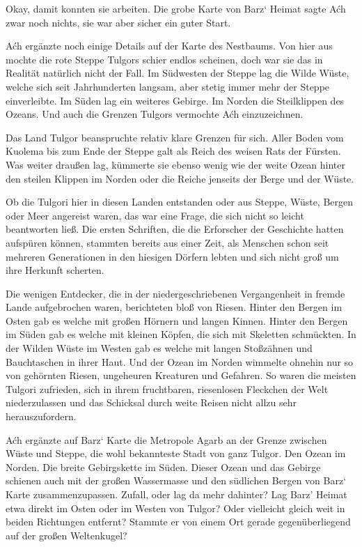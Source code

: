 Okay, damit konnten sie arbeiten. Die grobe Karte von Barz‘ Heimat sagte Aćh zwar noch nichts, sie war aber sicher ein guter Start.

Aćh ergänzte noch einige Details auf der Karte des Nestbaums. Von hier aus mochte die rote Steppe Tulgors schier endlos scheinen, doch war sie das in Realität natürlich nicht der Fall. Im Südwesten der Steppe lag die Wilde Wüste, welche sich seit Jahrhunderten langsam, aber stetig immer mehr der Steppe einverleibte. Im Süden lag ein weiteres Gebirge. Im Norden die Steilklippen des Ozeans. Und auch die Grenzen Tulgors vermochte Aćh einzuzeichnen.

Das Land Tulgor beanspruchte relativ klare Grenzen für sich. Aller Boden vom Kuolema bis zum Ende der Steppe galt als Reich des weisen Rats der Fürsten. Was weiter draußen lag, kümmerte sie ebenso wenig wie der weite Ozean hinter den steilen Klippen im Norden oder die Reiche jenseits der Berge und der Wüste.

Ob die Tulgori hier in diesen Landen entstanden oder aus Steppe, Wüste, Bergen oder Meer angereist waren, das war eine Frage, die sich nicht so leicht beantworten ließ. Die ersten Schriften, die die Erforscher der Geschichte hatten aufspüren können, stammten bereits aus einer Zeit, als Menschen schon seit mehreren Generationen in den hiesigen Dörfern lebten und sich nicht groß um ihre Herkunft scherten.

Die wenigen Entdecker, die in der niedergeschriebenen Vergangenheit in fremde Lande aufgebrochen waren, berichteten bloß von Riesen. Hinter den Bergen im Osten gab es welche mit großen Hörnern und langen Kinnen. Hinter den Bergen im Süden gab es welche mit kleinen Köpfen, die sich mit Skeletten schmückten. In der Wilden Wüste im Westen gab es welche mit langen Stoßzähnen und Bauchtaschen in ihrer Haut. Und der Ozean im Norden wimmelte ohnehin nur so von gehörnten Riesen, ungeheuren Kreaturen und Gefahren. So waren die meisten Tulgori zufrieden, sich in ihrem fruchtbaren, riesenlosen Fleckchen der Welt niederzulassen und das Schicksal durch weite Reisen nicht allzu sehr herauszufordern.

Aćh ergänzte auf Barz‘ Karte die Metropole Agarb an der Grenze zwischen Wüste und Steppe, die wohl bekannteste Stadt von ganz Tulgor. Den Ozean im Norden. Die breite Gebirgskette im Süden. Dieser Ozean und das Gebirge schienen auch mit der großen Wassermasse und den südlichen Bergen von Barz‘ Karte zusammenzupassen. Zufall, oder lag da mehr dahinter? Lag Barz’ Heimat etwa direkt im Osten oder im Westen von Tulgor? Oder vielleicht gleich weit in beiden Richtungen entfernt? Stammte er von einem Ort gerade gegenüberliegend auf der großen Weltenkugel?

